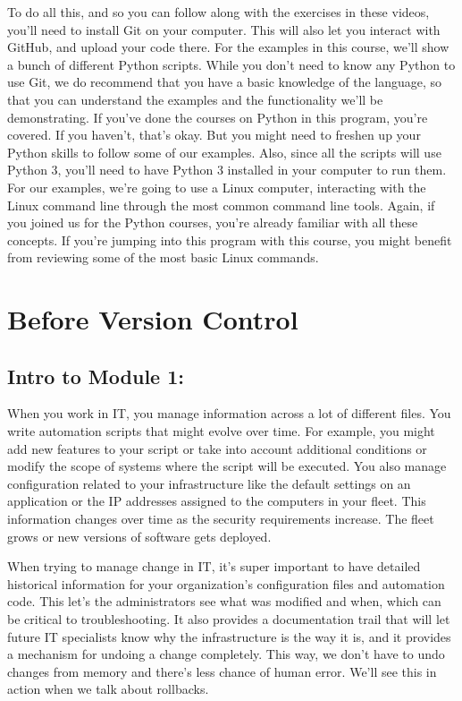 To do all this, and so you can follow along with the exercises in these videos, you'll need to install Git on your computer. This will also let you interact with GitHub, and upload your code there. For the examples in this course, we'll show a bunch of different Python scripts. While you don't need to know any Python to use Git, we do recommend that you have a basic knowledge of the language, so that you can understand the examples and the functionality we'll be demonstrating. If you've done the courses on Python in this program, you're covered. If you haven't, that's okay. But you might need to freshen up your Python skills to follow some of our examples. Also, since all the scripts will use Python 3, you'll need to have Python 3 installed in your computer to run them. For our examples, we're going to use a Linux computer, interacting with the Linux command line through the most common command line tools. Again, if you joined us for the Python courses, you're already familiar with all these concepts. If you're jumping into this program with this course, you might benefit from reviewing some of the most basic Linux commands. 


\section{Before Version Control}

	\subsection{Intro to Module 1:}
	
	
	When you work in IT, you manage information across a lot of different files. 
	You write automation scripts that might evolve over time. For example, you might add new features to your script or take into account additional conditions or modify the scope of systems where the script will be executed. 
	You also manage configuration related to your infrastructure like the default settings on an application or the IP addresses assigned to the computers in your fleet. This information changes over time as the security requirements increase. The fleet grows or new versions of software gets deployed. 
	
	When trying to manage change in IT, it's super important to have detailed historical information for your organization's configuration files and automation code. This let's the administrators see what was modified and when, which can be critical to troubleshooting. 
	It also provides a documentation trail that will let future IT specialists know why the infrastructure is the way it is, and it provides a mechanism for undoing a change completely. This way, we don't have to undo changes from memory and there's less chance of human error. We'll see this in action when we talk about rollbacks. 
	
